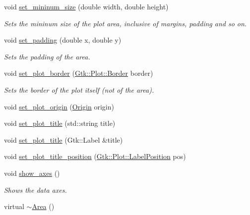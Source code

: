 \begin{DoxyCompactItemize}
void \hyperlink{classGtk_1_1Plot_1_1Area_ad02555415cfec562f6333a54e491806f}{set\_\-mininum\_\-size} (double width, double height)
\begin{DoxyCompactList}\small\item\em Sets the mininum size of the plot area, inclusive of margins, padding and so on. \item\end{DoxyCompactList}\item 
void \hyperlink{classGtk_1_1Plot_1_1Area_a44b182e39eab6618344524c0ddc5362c}{set\_\-padding} (double x, double y)
\begin{DoxyCompactList}\small\item\em Sets the padding of the area. \item\end{DoxyCompactList}\item 
void \hyperlink{classGtk_1_1Plot_1_1Area_a1eac5a10b44cc7cff1c7c238659d6fef}{set\_\-plot\_\-border} (\hyperlink{structGtk_1_1Plot_1_1Border}{Gtk::Plot::Border} border)
\begin{DoxyCompactList}\small\item\em Sets the border of the plot itself (not of the area). \item\end{DoxyCompactList}\item 
void \hyperlink{classGtk_1_1Plot_1_1Area_a2f056d2340f08b59ba04c4c890d98f0b}{set\_\-plot\_\-origin} (\hyperlink{namespaceGtk_1_1Plot_a0ce4e6f495df606dd5b947ea1512490f}{Origin} origin)
\item 
void \hyperlink{classGtk_1_1Plot_1_1Area_aada203f9074e4b7e98631eff6d9a711e}{set\_\-plot\_\-title} (std::string title)
\item 
void \hyperlink{classGtk_1_1Plot_1_1Area_ab6fa6f90087da8c0cf42565c4ad55e10}{set\_\-plot\_\-title} (Gtk::Label \&title)
\item 
void \hyperlink{classGtk_1_1Plot_1_1Area_a59e21443681606bfefc610ef7913e717}{set\_\-plot\_\-title\_\-position} (\hyperlink{namespaceGtk_1_1Plot_a125746674247df0f29cb6d6aa8089cb6}{Gtk::Plot::LabelPosition} pos)
\item 
void \hyperlink{classGtk_1_1Plot_1_1Area_aba6e491e72d135eb80e8fa29cdc06165}{show\_\-axes} ()
\begin{DoxyCompactList}\small\item\em Shows the data axes. \item\end{DoxyCompactList}\item 
virtual \hyperlink{classGtk_1_1Plot_1_1Area_a474a966b91e311f5591718135a850b48}{$\sim$Area} ()
\end{DoxyCompactItemize}
